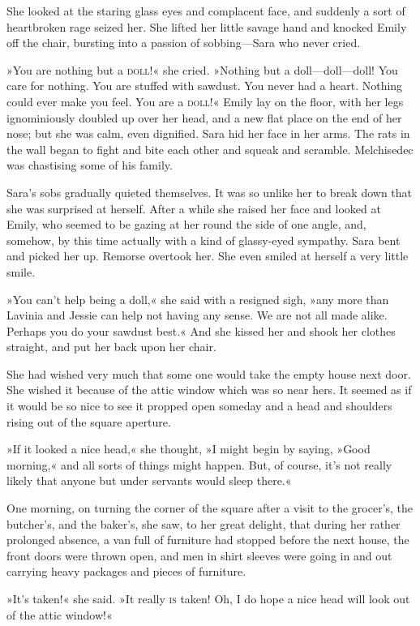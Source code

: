 She looked at the staring glass eyes and complacent face, and suddenly a sort of heartbroken rage seized her. She lifted her little savage hand and knocked Emily off the chair, bursting into a passion of sobbing—Sara who never cried.

»You are nothing but a \textsc{doll}!« she cried. »Nothing but a doll—doll—doll! You care for nothing. You are stuffed with sawdust. You never had a heart. Nothing could ever make you feel. You are a \textsc{doll}!« Emily lay on the floor, with her legs ignominiously doubled up over her head, and a new flat place on the end of her nose; but she was calm, even dignified. Sara hid her face in her arms. The rats in the wall began to fight and bite each other and squeak and scramble. Melchisedec was chastising some of his family.

Sara's sobs gradually quieted themselves. It was so unlike her to break down that she was surprised at herself. After a while she raised her face and looked at Emily, who seemed to be gazing at her round the side of one angle, and, somehow, by this time actually with a kind of glassy-eyed sympathy. Sara bent and picked her up. Remorse overtook her. She even smiled at herself a very little smile.

»You can't help being a doll,« she said with a resigned sigh, »any more than Lavinia and Jessie can help not having any sense. We are not all made alike. Perhaps you do your sawdust best.« And she kissed her and shook her clothes straight, and put her back upon her chair.

She had wished very much that some one would take the empty house next door. She wished it because of the attic window which was so near hers. It seemed as if it would be so nice to see it propped open someday and a head and shoulders rising out of the square aperture.

»If it looked a nice head,« she thought, »I might begin by saying, »Good morning,« and all sorts of things might happen. But, of course, it's not really likely that anyone but under servants would sleep there.«

One morning, on turning the corner of the square after a visit to the grocer's, the butcher's, and the baker's, she saw, to her great delight, that during her rather prolonged absence, a van full of furniture had stopped before the next house, the front doors were thrown open, and men in shirt sleeves were going in and out carrying heavy packages and pieces of furniture.

»It's taken!« she said. »It really \textsc{is} taken! Oh, I do hope a nice head will look out of the attic window!«

